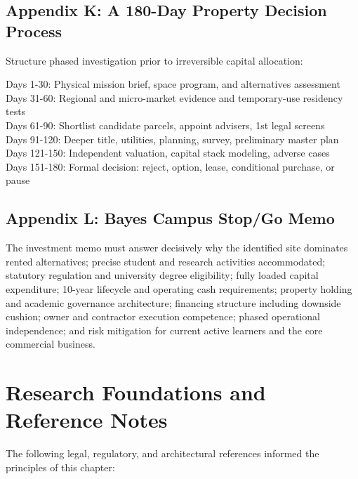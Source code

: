 \subsection{Appendix K: A 180-Day Property Decision Process}

Structure phased investigation prior to irreversible capital allocation:

\begin{tcolorbox}[colback=BayesCanvas,colframe=BayesDark,arc=1mm,title=\textbf{Appendix K: A 180-Day Property Decision Process}]
\scriptsize\ttfamily
Days 1-30: Physical mission brief, space program, and alternatives assessment\\
Days 31-60: Regional and micro-market evidence and temporary-use residency tests\\
Days 61-90: Shortlist candidate parcels, appoint advisers, 1st legal screens\\
Days 91-120: Deeper title, utilities, planning, survey, preliminary master plan\\
Days 121-150: Independent valuation, capital stack modeling, adverse cases\\
Days 151-180: Formal decision: reject, option, lease, conditional purchase, or pause
\end{tcolorbox}

\subsection{Appendix L: Bayes Campus Stop/Go Memo}

The investment memo must answer decisively why the identified site dominates rented alternatives; precise student and research activities accommodated; statutory regulation and university degree eligibility; fully loaded capital expenditure; 10-year lifecycle and operating cash requirements; property holding and academic governance architecture; financing structure including downside cushion; owner and contractor execution competence; phased operational independence; and risk mitigation for current active learners and the core commercial business.

\section{Research Foundations and Reference Notes}

The following legal, regulatory, and architectural references informed the principles of this chapter:

